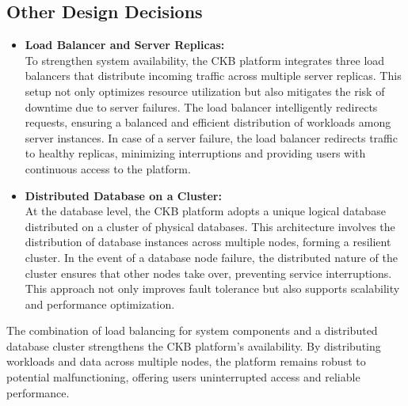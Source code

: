 \begin{itemize}
\end{itemize}

\subsection{Other Design Decisions}
\begin{itemize}
    \item \textbf{Load Balancer and Server Replicas:} \\
    To strengthen system availability, the CKB platform integrates three load balancers that distribute incoming traffic across multiple server replicas. This setup not only optimizes resource utilization but also mitigates the risk of downtime due to server failures. The load balancer intelligently redirects requests, ensuring a balanced and efficient distribution of workloads among server instances. In case of a server failure, the load balancer redirects traffic to healthy replicas, minimizing interruptions and providing users with continuous access to the platform.
    \item \textbf{Distributed Database on a Cluster:} \\
    At the database level, the CKB platform adopts a unique logical database distributed on a cluster of physical databases. This architecture involves the distribution of database instances across multiple nodes, forming a resilient cluster. In the event of a database node failure, the distributed nature of the cluster ensures that other nodes take over, preventing service interruptions. This approach not only improves fault tolerance but also supports scalability and performance optimization.
\end{itemize}
The combination of load balancing for system components and a distributed database cluster strengthens the CKB platform's availability. By distributing workloads and data across multiple nodes, the platform remains robust to potential malfunctioning, offering users uninterrupted access and reliable performance. 

